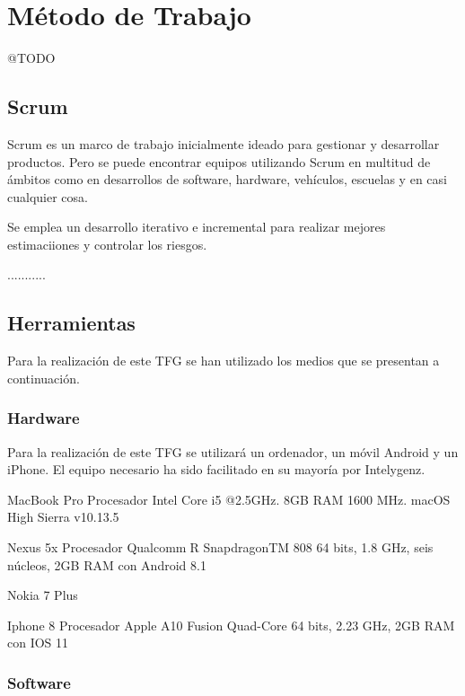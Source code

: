 \chapter{Método de Trabajo}
\label{chap:metodo}

@TODO

\section{Scrum}

Scrum es un marco de trabajo inicialmente ideado para gestionar y desarrollar productos. Pero
se puede encontrar equipos utilizando Scrum en multitud de ámbitos como en desarrollos de 
software, hardware, vehículos, escuelas y en casi cualquier cosa.

Se emplea un desarrollo iterativo e incremental para realizar mejores estimaciiones y controlar 
los riesgos. 

...........


\section{Herramientas}

Para la realización de este \acs{TFG} se han utilizado los medios que se presentan a continuación.

\subsection{Hardware}

Para la realización de este TFG se utilizará un ordenador, un móvil Android y un iPhone. El equipo 
necesario ha sido facilitado en su mayoría por Intelygenz.

\begin{description}
	\item MacBook Pro Procesador Intel Core i5 @2.5GHz. 8GB RAM 1600 MHz. macOS High Sierra v10.13.5
	\item Nexus 5x Procesador Qualcomm⃝R SnapdragonTM 808 64 bits, 1.8 GHz, seis núcleos, 2GB RAM con Android 8.1
	\item Nokia 7 Plus
	\item Iphone 8 Procesador Apple A10 Fusion Quad-Core 64 bits, 2.23 GHz, 2GB RAM con IOS 11
\end{description}

\subsection{Software}

